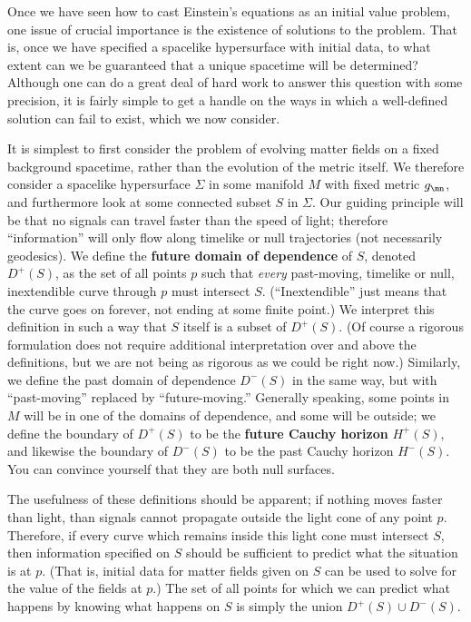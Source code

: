 \begin{figure}
  \centerline{
  }
\end{figure}

Once we have seen how to cast Einstein's equations as an initial
value problem, one issue of crucial importance is the existence of
solutions to the problem.  That is, once we have specified a spacelike
hypersurface with initial data, to what extent can we be guaranteed
that a unique spacetime will be determined?  Although one can do a 
great deal of hard work to answer this question with some precision,
it is fairly simple to get a handle on the ways in which a well-defined
solution can fail to exist, which we now consider.

It is simplest to first consider the problem of evolving matter fields
on a fixed background spacetime, rather than the evolution of the
metric itself.  We therefore consider a spacelike hypersurface $\Sigma$
in some manifold $M$ with fixed metric $g_\mn$, and furthermore look
at some connected subset $S$ in $\Sigma$.  Our guiding principle will
be that no signals can travel faster than the speed of light; therefore
``information'' will only flow along timelike or null trajectories
(not necessarily geodesics).  We define the {\bf future domain of
dependence} of $S$, denoted $D^+(S)$, as the set of all points $p$ such
that {\it every} past-moving, timelike or null, inextendible curve through
$p$ must intersect $S$.  (``Inextendible'' just means that the curve
goes on forever, not ending at some finite point.)  We interpret this
definition in such a way that $S$ itself is a subset of $D^+(S)$.  (Of
course a rigorous formulation does not require additional interpretation
over and above the definitions, but we are not being as rigorous
as we could be right now.)  Similarly, we 
define the past domain of dependence $D^-(S)$ in the same way, but
with ``past-moving'' replaced by ``future-moving.''  Generally
speaking, some points in $M$ will be in one of the domains of dependence,
and some will be outside; we define the boundary of $D^+(S)$ to be
the {\bf future Cauchy horizon} $H^+(S)$, and likewise the boundary of 
$D^-(S)$ to be the past Cauchy horizon $H^-(S)$.  You can convince
yourself that they are both null surfaces.

\begin{figure}[h]
  \centerline{
  }
\end{figure}

The usefulness of these definitions should be apparent; if nothing
moves faster than light, than signals cannot propagate outside the
light cone of any point $p$.  Therefore, if every curve which
remains inside this light cone must intersect $S$, then information
specified on $S$ should be sufficient to predict what the situation
is at $p$.  (That is, initial data for matter fields given on $S$
can be used to solve for the value of the fields at $p$.)  The set
of all points for which we can predict what happens by knowing 
what happens on $S$ is simply the union $D^+(S)\cup D^-(S)$.

